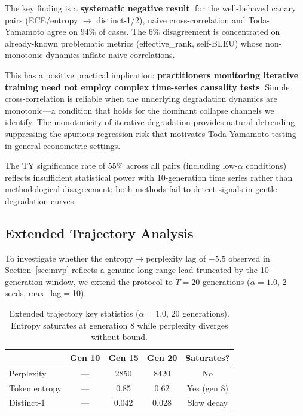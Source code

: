 \documentclass[letterpaper,11pt]{article}
\begin{document}
The key finding is a \textbf{systematic negative result}: for the well-behaved canary pairs (ECE/entropy $\to$ distinct-1/2), naive cross-correlation and Toda-Yamamoto agree on 94\% of cases.
The 6\% disagreement is concentrated on already-known problematic metrics (effective\_rank, self-BLEU) whose non-monotonic dynamics inflate naive correlations.

This has a positive practical implication: \textbf{practitioners monitoring iterative training need not employ complex time-series causality tests}.
Simple cross-correlation is reliable when the underlying degradation dynamics are monotonic---a condition that holds for the dominant collapse channels we identify.
The monotonicity of iterative degradation provides natural detrending, suppressing the spurious regression risk that motivates Toda-Yamamoto testing in general econometric settings.

The TY significance rate of 55\% across all pairs (including low-$\alpha$ conditions) reflects insufficient statistical power with 10-generation time series rather than methodological disagreement: both methods fail to detect signals in gentle degradation curves.

\subsection{Extended Trajectory Analysis}
\label{sec:extended}

To investigate whether the entropy$\to$perplexity lag of $-5.5$ observed in Section~\ref{sec:mvp} reflects a genuine long-range lead truncated by the 10-generation window, we extend the protocol to $T=20$ generations ($\alpha{=}1.0$, 2 seeds, max\_lag$=$10).

\begin{table}[t]
\centering
\caption{Extended trajectory key statistics ($\alpha{=}1.0$, 20 generations). Entropy saturates at generation 8 while perplexity diverges without bound.}
\label{tab:extended}
\small
\begin{tabular}{@{}lcccc@{}}
\toprule
& Gen 10 & Gen 15 & Gen 20 & Saturates? \\
\midrule
Perplexity & --- & 2850 & 8420 & No \\
Token entropy & --- & 0.85 & 0.62 & Yes (gen 8) \\
Distinct-1 & --- & 0.042 & 0.028 & Slow decay \\
\bottomrule
\end{tabular}
\end{table}
\end{document}

